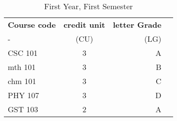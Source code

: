 \documentclass{article}
\begin{document}
	\begin{table}[h!]
		\begin{center}
			\caption{First Year, First Semester}
			\label{tab:table1}
			\begin{tabular}{l|c|r|c}
				\textbf{Course code} & \textbf{credit unit} & \textbf{letter Grade}\\ - & (CU) & (LG)\\
				CSC 101 & 3 & A\\
				mth 101 & 3 & B\\
				chm 101 & 3 & C\\
				PHY 107 & 3 & D\\
				GST 103 & 2 & A\\
			\end{tabular}
		\end{center}
	\end{table}
\end{document}
